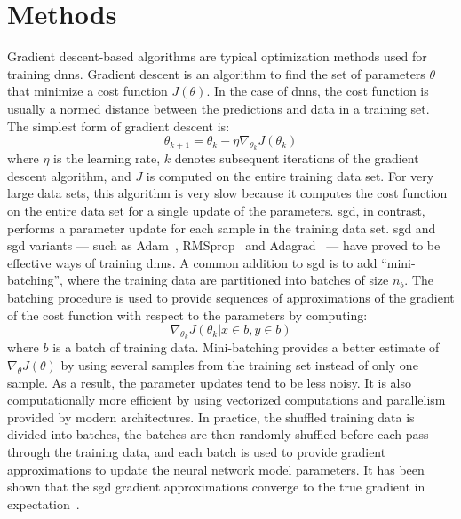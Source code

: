 \documentclass[review]{elsarticle}
\begin{document}
\section{Methods}\label{sec:methods}
Gradient descent-based algorithms are typical optimization methods used for
training \glspl{dnn}.  Gradient descent is an algorithm to find the set of parameters
$\theta$ that minimize a cost function $J(\theta)$. In the case of \glspl{dnn}, the cost
function is usually a normed distance between the predictions and data in a
training set. The simplest form of gradient descent is:
\begin{equation}
\theta_{k+1} = \theta_k - \eta \nabla_{\theta_k} J(\theta_k)
\label{eq:GD}
\end{equation}
where $\eta$ is the learning rate, $k$ denotes subsequent iterations
of the gradient descent algorithm, and $J$ is computed on the entire
training data set. For very large data sets, this algorithm is very
slow because it computes the cost function on the entire data set for
a single update of the parameters. \Gls{sgd}, in contrast, performs a
parameter update for each sample in the training data set. \gls{sgd}
and \gls{sgd} variants --- such as Adam~\cite{kingma2014adam},
RMSprop~\cite{tieleman2012lecture} and
Adagrad~\cite{duchi2011adaptive} --- have proved to be effective ways
of training \glspl{dnn}. A common addition to \gls{sgd} is to add
``mini-batching'', where the training data are partitioned into
batches of size $n_b$. The batching procedure is used to provide
sequences of approximations of the gradient of the cost function with
respect to the parameters by computing:
\begin{equation}
  \nabla_{\theta_k} J(\theta_k|x \in b, y \in b)
\end{equation}
where $b$ is a batch of training data. Mini-batching provides a better
estimate of $\nabla_\theta J(\theta)$ by using several samples from
the training set instead of only one sample. As a result, the
parameter updates tend to be less noisy. It is also computationally
more efficient by using vectorized computations and parallelism
provided by modern architectures. In practice, the shuffled training
data is divided into batches, the batches are then randomly shuffled
before each pass through the training data, and each batch is used to
provide gradient approximations to update the neural network model
parameters. It has been shown that the \gls{sgd} gradient
approximations converge to the true gradient in
expectation~\cite{bottou2010large}.
\end{document}
